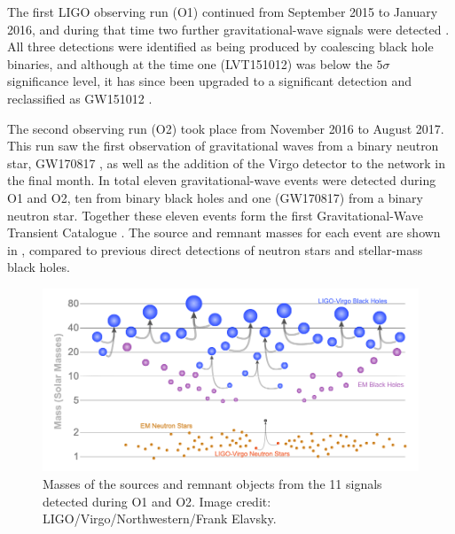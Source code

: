 \begin{colsection}
The first LIGO observing run (O1)  continued from September 2015 to January 2016, and during that time two further gravitational-wave signals were detected \citep{LIGO_O1}. All three detections were identified as being produced by coalescing black hole binaries, and although at the time one (LVT151012) was below the $5\sigma$ significance level, it has since been upgraded to a significant detection and reclassified as GW151012 \citep{GW_catalog}.

The second observing run (O2)  took place from November 2016 to August 2017. This run saw the first observation of gravitational waves from a binary neutron star, GW170817 \citep{GW170817}, as well as the addition of the Virgo detector to the network in the final month. In total eleven gravitational-wave events were detected during O1 and O2, ten from binary black holes and one (GW170817) from a binary neutron star. Together these eleven events form the first Gravitational-Wave Transient Catalogue  \citep[GWTC-1;][]{GW_catalog}. The source and remnant masses for each event are shown in , compared to previous direct detections of neutron stars and stellar-mass black holes.

\begin{figure}[t]
    \begin{center}
        \includegraphics[width=\linewidth]{images/gw_masses2.png}
    \end{center}
    \caption[Sources of gravitational waves detected during O1 and O2]{
        Masses of the sources and remnant objects from the 11 signals detected during O1 and O2. Image credit: LIGO/Virgo/Northwestern/Frank Elavsky.
        }\label{fig:gw_masses}
\end{figure}


\end{colsection}
